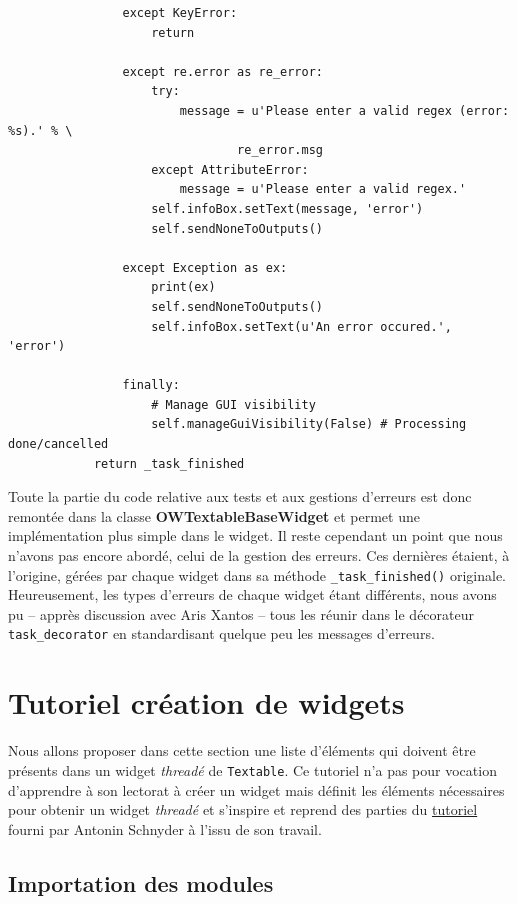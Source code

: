 \documentclass{article}
\begin{document}
{\begin{verbatim}
                except KeyError:
                    return
                
                except re.error as re_error:
                    try:
                        message = u'Please enter a valid regex (error: %s).' % \
                                re_error.msg
                    except AttributeError:
                        message = u'Please enter a valid regex.'
                    self.infoBox.setText(message, 'error')
                    self.sendNoneToOutputs()

                except Exception as ex:
                    print(ex)
                    self.sendNoneToOutputs()
                    self.infoBox.setText(u'An error occured.', 'error')

                finally:
                    # Manage GUI visibility
                    self.manageGuiVisibility(False) # Processing done/cancelled
            return _task_finished
\end{verbatim}

Toute la partie du code relative aux tests et aux gestions d'erreurs est donc remontée dans la classe \textbf{OWTextableBaseWidget} et permet une implémentation plus simple dans le widget.
\newline
Il reste cependant un point que nous n'avons pas encore abordé, celui de la gestion des erreurs. Ces dernières étaient, à l'origine, gérées par chaque widget dans sa méthode \texttt{\_task\_finished()} originale. Heureusement, les types d'erreurs de chaque widget étant différents, nous avons pu – apprès discussion avec Aris Xantos – tous les réunir dans le décorateur \texttt{task\_decorator} en standardisant quelque peu les messages d'erreurs.

\section{Tutoriel création de widgets}

Nous allons proposer dans cette section une liste d'éléments qui doivent être présents dans un widget \textit{threadé} de \texttt{Textable}. Ce tutoriel n'a pas pour vocation d'apprendre à son lectorat à créer un widget mais définit les éléments nécessaires pour obtenir un widget \textit{threadé} et s'inspire et reprend des parties du \href{https://docs.google.com/document/d/1QtXm2aYMZXAyM7mfBTqxt_XrTNFqC7e3aqy7OC1A_18/edit#heading=h.xyhgv3cij1d7}{tutoriel} fourni par Antonin Schnyder à l'issu de son travail.

\subsection{Importation des modules}

}
\end{document}
